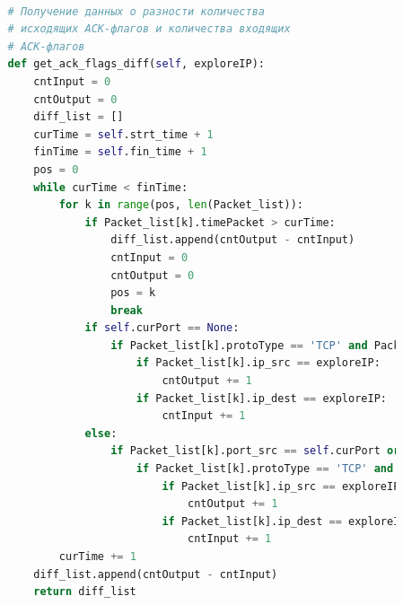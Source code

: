 \documentclass[bachelor, och, coursework]{SCWorks}
\begin{document}
\begin{lstlisting}[language=Python]
      
          # Получение данных о разности количества
          # исходящих ACK-флагов и количества входящих
          # ACK-флагов
          def get_ack_flags_diff(self, exploreIP):
              cntInput = 0
              cntOutput = 0
              diff_list = []
              curTime = self.strt_time + 1
              finTime = self.fin_time + 1
              pos = 0
              while curTime < finTime:
                  for k in range(pos, len(Packet_list)):
                      if Packet_list[k].timePacket > curTime:
                          diff_list.append(cntOutput - cntInput)
                          cntInput = 0
                          cntOutput = 0
                          pos = k
                          break
                      if self.curPort == None:
                          if Packet_list[k].protoType == 'TCP' and Packet_list[k].fl_ack == '1':
                              if Packet_list[k].ip_src == exploreIP:
                                  cntOutput += 1
                              if Packet_list[k].ip_dest == exploreIP:
                                  cntInput += 1
                      else:
                          if Packet_list[k].port_src == self.curPort or Packet_list[k].port_dest == self.curPort:
                              if Packet_list[k].protoType == 'TCP' and Packet_list[k].fl_ack == '1':
                                  if Packet_list[k].ip_src == exploreIP:
                                      cntOutput += 1
                                  if Packet_list[k].ip_dest == exploreIP:
                                      cntInput += 1
                  curTime += 1
              diff_list.append(cntOutput - cntInput)
              return diff_list
      

\end{lstlisting}
\end{document}
